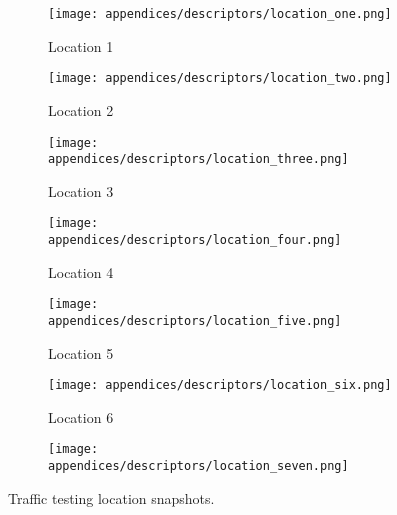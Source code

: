 \begin{figure}[H]
	\centering
	\begin{subfigure}[b]{0.45\linewidth}
        \centering\texttt{[image: appendices/descriptors/location\_one.png]}
        \caption{Location 1}
		\label{fig:location_one}
    \end{subfigure}
    \begin{subfigure}[b]{0.45\linewidth}
        \centering\texttt{[image: appendices/descriptors/location\_two.png]}
        \caption{Location 2}
        \label{fig:location_two}
    \end{subfigure}
    \begin{subfigure}[b]{0.45\linewidth}
        \centering\texttt{[image: appendices/descriptors/location\_three.png]}
        \caption{Location 3}
        \label{fig:location_three}
    \end{subfigure}
    \begin{subfigure}[b]{0.45\linewidth}
        \centering\texttt{[image: appendices/descriptors/location\_four.png]}
        \caption{Location 4}
        \label{fig:location_four}
    \end{subfigure}
    \begin{subfigure}[b]{0.45\linewidth}
        \centering\texttt{[image: appendices/descriptors/location\_five.png]}
        \caption{Location 5}
        \label{fig:location_five}
    \end{subfigure}
    \begin{subfigure}[b]{0.45\linewidth}
        \centering\texttt{[image: appendices/descriptors/location\_six.png]}
        \caption{Location 6}
        \label{fig:location_six}
    \end{subfigure}
    \begin{subfigure}[b]{0.45\linewidth}
        \centering\texttt{[image: appendices/descriptors/location\_seven.png]}
        \caption{}
        \label{fig:location_seven}
    \end{subfigure}
\caption{Traffic testing location snapshots.}
\label{fig:location_snapshots}
\end{figure}
